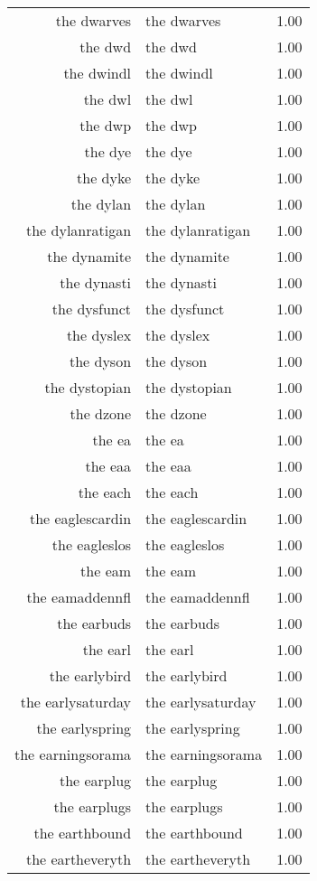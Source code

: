 \begin{table}[ht]
\begin{tabular}{rlr}
  the dwarves & the dwarves & 1.00 \\ 
  the dwd & the dwd & 1.00 \\ 
  the dwindl & the dwindl & 1.00 \\ 
  the dwl & the dwl & 1.00 \\ 
  the dwp & the dwp & 1.00 \\ 
  the dye & the dye & 1.00 \\ 
  the dyke & the dyke & 1.00 \\ 
  the dylan & the dylan & 1.00 \\ 
  the dylanratigan & the dylanratigan & 1.00 \\ 
  the dynamite & the dynamite & 1.00 \\ 
  the dynasti & the dynasti & 1.00 \\ 
  the dysfunct & the dysfunct & 1.00 \\ 
  the dyslex & the dyslex & 1.00 \\ 
  the dyson & the dyson & 1.00 \\ 
  the dystopian & the dystopian & 1.00 \\ 
  the dzone & the dzone & 1.00 \\ 
  the ea & the ea & 1.00 \\ 
  the eaa & the eaa & 1.00 \\ 
  the each & the each & 1.00 \\ 
  the eaglescardin & the eaglescardin & 1.00 \\ 
  the eagleslos & the eagleslos & 1.00 \\ 
  the eam & the eam & 1.00 \\ 
  the eamaddennfl & the eamaddennfl & 1.00 \\ 
  the earbuds & the earbuds & 1.00 \\ 
  the earl & the earl & 1.00 \\ 
  the earlybird & the earlybird & 1.00 \\ 
  the earlysaturday & the earlysaturday & 1.00 \\ 
  the earlyspring & the earlyspring & 1.00 \\ 
  the earningsorama & the earningsorama & 1.00 \\ 
  the earplug & the earplug & 1.00 \\ 
  the earplugs & the earplugs & 1.00 \\ 
  the earthbound & the earthbound & 1.00 \\ 
  the eartheveryth & the eartheveryth & 1.00 \\ 

\end{tabular}
\end{table}
